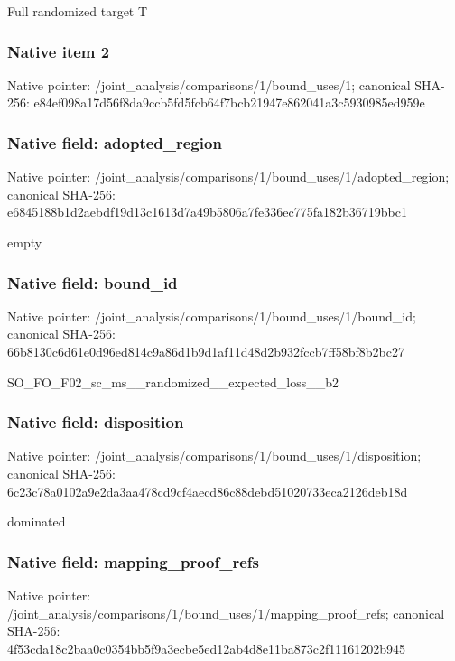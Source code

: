 \documentclass[10pt,a4paper]{article}
\begin{document}
\begingroup\raggedright\sloppy Full randomized target T\par\endgroup

\subsubsection{Native item 2}
Native pointer: /joint\_\allowbreak{}analysis/comparisons/1/bound\_\allowbreak{}uses/1; canonical SHA-256: e84ef098a17d56f8da9ccb5fd5fcb64f7bcb21947e862041a3c5930985ed959e

\subsubsection{Native field: adopted\_\allowbreak{}region}
Native pointer: /joint\_\allowbreak{}analysis/comparisons/1/bound\_\allowbreak{}uses/1/adopted\_\allowbreak{}region; canonical SHA-256: e6845188b1d2aebdf19d13c1613d7a49b5806a7fe336ec775fa182b36719bbc1

\begingroup\raggedright\sloppy empty\par\endgroup

\subsubsection{Native field: bound\_\allowbreak{}id}
Native pointer: /joint\_\allowbreak{}analysis/comparisons/1/bound\_\allowbreak{}uses/1/bound\_\allowbreak{}id; canonical SHA-256: 66b8130c6d61e0d96ed814c9a86d1b9d1af11d48d2b932fccb7ff58bf8b2bc27

\begingroup\raggedright\sloppy SO\_\allowbreak{}FO\_\allowbreak{}F02\_\allowbreak{}sc\_\allowbreak{}ms\_\allowbreak{}\_\allowbreak{}randomized\_\allowbreak{}\_\allowbreak{}expected\_\allowbreak{}loss\_\allowbreak{}\_\allowbreak{}b2\par\endgroup

\subsubsection{Native field: disposition}
Native pointer: /joint\_\allowbreak{}analysis/comparisons/1/bound\_\allowbreak{}uses/1/disposition; canonical SHA-256: 6c23c78a0102a9e2da3aa478cd9cf4aecd86c88debd51020733eca2126deb18d

\begingroup\raggedright\sloppy dominated\par\endgroup

\subsubsection{Native field: mapping\_\allowbreak{}proof\_\allowbreak{}refs}
Native pointer: /joint\_\allowbreak{}analysis/comparisons/1/bound\_\allowbreak{}uses/1/mapping\_\allowbreak{}proof\_\allowbreak{}refs; canonical SHA-256: 4f53cda18c2baa0c0354bb5f9a3ecbe5ed12ab4d8e11ba873c2f11161202b945
\end{document}
